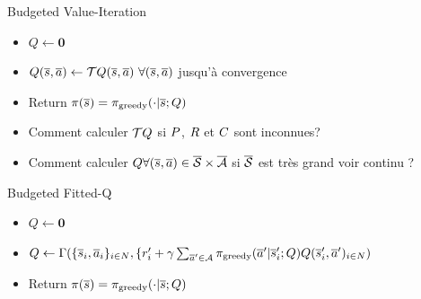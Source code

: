 \documentclass[french,handout]{beamer}
\begin{document}
    \begin{frame}

        \begin{block}{Budgeted Value-Iteration}
            \begin{itemize}
                \item $Q \leftarrow \mathbf{0}$
                \item $Q(\os,\oa) \leftarrow \bo Q(\os,\oa)\ \forall (\os,\oa)$ jusqu'à convergence %
                \item Return $\pi(\overline{s}) = \pi_\text{greedy}(\cdot|\overline{s}; Q)$
            \end{itemize}
        \end{block}

        \begin{alertblock}{}
            \begin{itemize}
                \item Comment calculer $\mathcal{T} Q$ si $P$, $R$ et $C$ sont inconnues?
                \item Comment calculer $Q \forall (\overline{s},\overline{a}) \in \overline{\mathcal{S}}\times\overline{\mathcal{A}}$ si $\overline{\mathcal{S}}$ est très grand voir continu ?
            \end{itemize}

        \end{alertblock}

        \begin{block}{Budgeted Fitted-Q}
            \begin{itemize}
                \item $Q \leftarrow \mathbf{0}$
                \item $Q \leftarrow \Gamma(\{\overline{s}_{i},\overline{a}_{i}\}_{{i}\in N},\{r'_{i} + \gamma \sum_{\overline{a}'\in \mathcal{A}} \pi_\text{greedy}(\overline{a}'|\overline{s}'_{i}; Q) Q(\overline{s}'_{i}, \overline{a}')_{{i} \in N})$
                \item Return $\pi(\overline{s}) = \pi_\text{greedy}(\cdot|\overline{s}; Q)$
            \end{itemize}
        \end{block}
    \end{frame}
\end{document}

